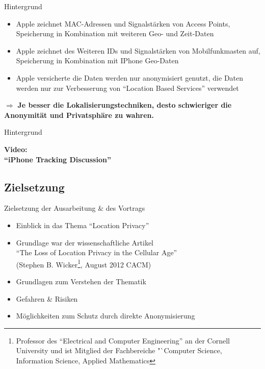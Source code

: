 \begin{frame}{Hintergrund}
\begin{itemize}
  \item Apple zeichnet MAC-Adressen und Signalstärken von Access Points, Speicherung in Kombination mit weiteren Geo- und Zeit-Daten
  \item Apple zeichnet des Weiteren IDs und Signalstärken von Mobilfunkmasten auf, Speicherung in Kombination mit IPhone Geo-Daten
  \item Apple versicherte die Daten werden nur anonymisiert genutzt, die Daten werden nur zur Verbesserung von "`Location Based Services"' verwendet
\end{itemize}
$\Rightarrow$ \textbf{Je besser die Lokalisierungstechniken, desto schwieriger die Anonymität und Privatsphäre zu wahren.}
\end{frame}

\begin{frame}{Hintergrund}
\begin{center}
  \huge \textbf{Video:\\\vspace{1cm} "`iPhone Tracking Discussion"'}
\end{center}
\vspace{2cm}
\begin{center}
  \href{run:iphone.mp4}{}
\end{center}
\end{frame}

\subsection{Zielsetzung}
\begin{frame}{Zielsetzung der Ausarbeitung \& des Vortrags}
\begin{itemize}
  \item Einblick in das Thema "`Location Privacy"'
  \item Grundlage war der wissenschaftliche Artikel\\
  "`The Loss of Location Privacy in the Cellular Age"'\\
  (Stephen B. Wicker\footnote{Professor des "`Electrical and Computer Engineering"' an der Cornell University und ist Mitglied der Fachbereiche "`Computer Science, Information Science, Applied Mathematics}, August 2012 CACM)
  \item Grundlagen zum Verstehen der Thematik
  \item Gefahren \& Risiken
  \item Möglichkeiten zum Schutz durch direkte Anonymisierung
\end{itemize}
\end{frame}

